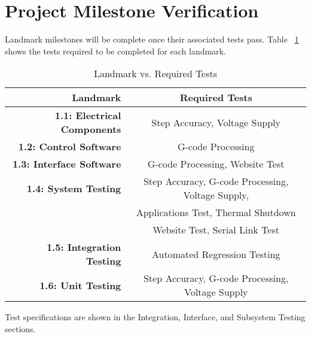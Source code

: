 \section{Project Milestone Verification}
Landmark milestones will be complete once their associated tests pass.
Table ~\ref{table:testvsland} shows the tests required to be completed for each landmark.

\begin{table}[H]
	\caption{Landmark vs. Required Tests}
	\label{table:testvsland}
	\centering
	\begin{tabular}{|r |c|} 
		\hline\hline
		\textbf{Landmark} & \textbf{Required Tests}\\
		\hline
		\textbf{1.1: Electrical Components} & Step Accuracy, Voltage Supply  \\
		\hline
		\textbf{1.2: Control Software} & G-code Processing  \\
		\hline
		\textbf{1.3: Interface Software} & G-code Processing, Website Test \\
		\hline
		\textbf{1.4: System Testing} & Step Accuracy, G-code Processing, Voltage Supply,\\ 
		& Applications Test, Thermal Shutdown\\
		& Website Test, Serial Link Test \\
		\hline
		\textbf{1.5: Integration Testing} & Automated Regression Testing\\
		\hline
		\textbf{1.6: Unit Testing} & Step Accuracy, G-code Processing, Voltage Supply\\
		\hline 
	\end{tabular}
\end{table}
Test specifications are shown in the Integration, Interface, and Subsystem Testing sections.

